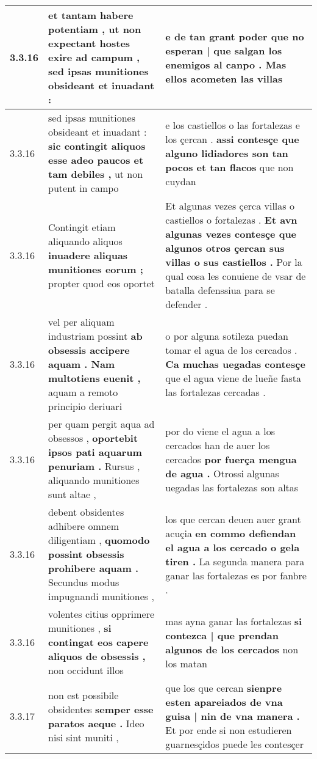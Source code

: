 \begin{tabular}{|p{1cm}|p{6.5cm}|p{6.5cm}|}
3.3.16 & et tantam habere potentiam , \textbf{ ut non expectant hostes exire ad campum , } sed ipsas munitiones obsideant et inuadant : & e de tan grant poder \textbf{ que no esperan | que salgan los enemigos al canpo . } Mas ellos acometen las villas \\\hline
3.3.16 & sed ipsas munitiones obsideant et inuadant : \textbf{ sic contingit aliquos esse adeo paucos et tam debiles , } ut non putent in campo & e los castiellos o las fortalezas e los çercan . \textbf{ assi contesçe que alguno lidiadores son tan pocos et tan flacos } que non cuydan \\\hline
3.3.16 & Contingit etiam aliquando aliquos \textbf{ inuadere aliquas munitiones eorum ; } propter quod eos oportet & Et algunas vezes çerca villas o castiellos o fortalezas . \textbf{ Et avn algunas vezes contesçe que algunos otros çercan sus villas o sus castiellos . } Por la qual cosa les conuiene de vsar de batalla defenssiua para se defender . \\\hline
3.3.16 & vel per aliquam industriam possint \textbf{ ab obsessis accipere aquam . Nam multotiens euenit , } aquam a remoto principio deriuari & o por alguna sotileza puedan tomar el agua de los cercados . \textbf{ Ca muchas uegadas contesçe } que el agua viene de lueñe fasta las fortalezas cercadas . \\\hline
3.3.16 & per quam pergit aqua ad obsessos , \textbf{ oportebit ipsos pati aquarum penuriam . } Rursus , aliquando munitiones sunt altae , & por do viene el agua a los cercados han de auer los cercados \textbf{ por fuerça mengua de agua . } Otrossi algunas uegadas las fortalezas son altas \\\hline
3.3.16 & debent obsidentes adhibere omnem diligentiam , \textbf{ quomodo possint obsessis prohibere aquam . } Secundus modus impugnandi munitiones , & los que cercan deuen auer grant acuçia \textbf{ en commo defiendan el agua a los cercado o gela tiren . } La segunda manera para ganar las fortalezas es por fanbre . \\\hline
3.3.16 & volentes citius opprimere munitiones , \textbf{ si contingat eos capere aliquos de obsessis , } non occidunt illos & mas ayna ganar las fortalezas \textbf{ si contezca | que prendan algunos de los cercados } non los matan \\\hline
3.3.17 & non est possibile obsidentes \textbf{ semper esse paratos aeque . } Ideo nisi sint muniti , & que los que cercan \textbf{ sienpre esten apareiados de vna guisa | nin de vna manera . } Et por ende si non estudieren guarnesçidos puede les contesçer \\\hline

\end{tabular}
